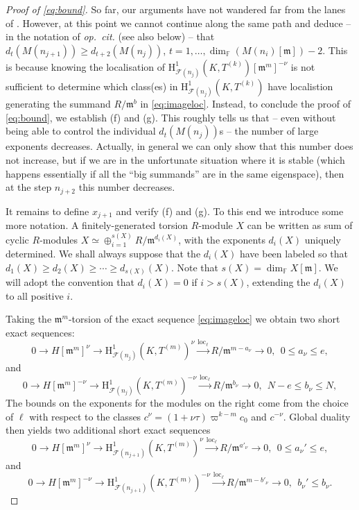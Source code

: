 \documentclass[a4paper,10pt]{amsart}
\numberwithin{equation}{section}
\numberwithin{equation}{section}
\theoremstyle{plain}
\theoremstyle{definition}
\theoremstyle{definition}
\theoremstyle{plain}
\theoremstyle{plain}
\theoremstyle{plain}
\theoremstyle{plain}
\newcommand{\F}{\mathcal{F}}
\DeclareMathOperator{\loc}{loc}
\newcommand{\Fcal}{\mathcal{F}}
\newcommand{\fm}{\mathfrak{m}}
\newcommand{\rH}{\mathrm{H}}
\begin{document}
\begin{proof}[Proof of \eqref{eq:bound}]
So far, our arguments have not wandered far from the lanes of \cite[\S 3.3.3]{eisenstein}.
However, at this point we cannot continue along the same path and deduce -- in the notation of {\em op.~cit.} (see also below) --
that $d_t(M(n_{j+1})) \geqslant d_{t+2}(M(n_{j}))$, $t=1,\dots,\dim_{\mathbb{F}}(M(n_{i})[\fm])-2$. This is because 
knowing the localisation of $\rH^1_{\Fcal(n_j)}(K,T^{(k)})[\fm^m]^{-\nu}$ is not sufficient to determine which class(es) in $\rH^1_{\Fcal(n_j)}(K,T^{(k)})$ 
have localistion generating the summand $R/\fm^b$ in \eqref{eq:imageloc}.  Instead, to conclude the proof of \eqref{eq:bound}, we establish (f) and (g). This roughly  tells us that -- even without being able to control the individual $d_t(M(n_{j}))$s -- the number of large exponents decreases. Actually, in general we can only show that this number does not increase, but if we are in the unfortunate situation where it is stable (which happens essentially if all the ``big summands'' are in the same eigenspace), then at the step $n_{j+2}$ this number decreases. 


It remains to define $x_{j+1}$ and verify (f) and (g).  To this end we introduce some more notation.  A finitely-generated torsion $R$-module $X$ can be written 
as sum of cyclic $R$-modules $X\simeq \oplus_{i=1}^{s(X)} R/\fm^{d_i(X)}$, with the exponents $d_i(X)$ uniquely determined.  We shall always suppose that
the $d_i(X)$ have been labeled so that $d_1(X)\geq d_2(X) \geq \cdots \geq d_{s(X)}(X)$.  Note that $s(X) = \dim_{\mathbb{F}} X[\fm]$.
We will adopt the convention that $d_i(X)= 0$ if $i>s(X)$, extending the $d_i(X)$ to all positive $i$.

Taking the $\fm^m$-torsion of the exact sequence \eqref{eq:imageloc} we obtain two short exact sequences:
\begin{equation}\label{eq:se-1}
0 \to H[\fm^m]^{\nu} \to \rH^1_{\F(n_j)}(K,T^{(m)})^{\nu} \xrightarrow{\loc_\ell} R/\fm^{m-a_{\nu}}\to 0, \ \ 0\leq a_{\nu}\leq e, 
\end{equation}
and
\begin{equation}\label{eq:se-2}
0 \to H[\fm^m]^{-\nu} \to \rH^1_{\F(n_j)}(K,T^{(m)})^{-\nu} \xrightarrow{\loc_\ell} R/\fm^{b_{\nu}}\to 0, \ \ N-e\leq b_{\nu}\leq N,
\end{equation}
The bounds on the exponents for the modules on the right come from the choice of $\ell$ with respect to the classes
$c^{\nu} = (1+\nu\tau)\varpi^{k-m}c_0$ and $c^{-\nu}$.  Global duality then yields two additional short exact sequences
\begin{equation}\label{eq:se-3}
0 \to H[\fm^m]^{\nu} \to \rH^1_{\F(n_{j+1})}(K,T^{(m)})^{\nu} \xrightarrow{\loc_\ell} R/\fm^{a'_{\nu}}\to 0, \ \ 0\leq a_{\nu}'\leq e, 
\end{equation}
and
\begin{equation}\label{eq:se-4}
0 \to H[\fm^m]^{-\nu} \to \rH^1_{\F(n_{j+1})}(K,T^{(m)})^{-\nu} \xrightarrow{\loc_\ell} R/\fm^{m-b'_{\nu}}\to 0, \ \ b_{\nu}'\leq b_{\nu}.
\end{equation}


\end{proof}
\end{document}
